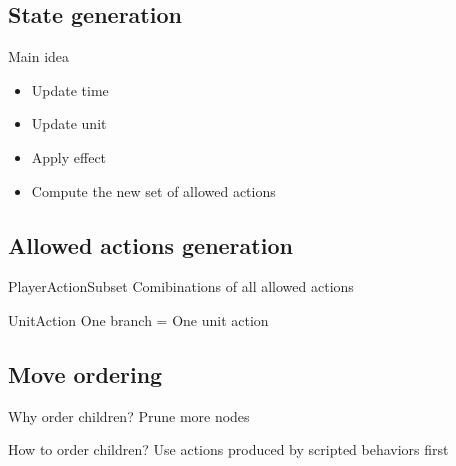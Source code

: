 \documentclass{beamer}
\newenvironment{framesubsec}{
    \begin{frame}{\subsecname}
}{\end{frame}}
\begin{document}
\subsection{State generation}
\begin{framesubsec}
    \begin{block}{Main idea}
        \begin{itemize}
            \item Update time
            \item Update unit
            \item Apply effect 
            \item Compute the new set of allowed actions 
        \end{itemize}
    \end{block}
\end{framesubsec}

\subsection{Allowed actions generation}
\begin{framesubsec}
    \begin{block}{PlayerActionSubset}
        Comibinations of all allowed actions
    \end{block}
    \begin{block}{UnitAction}
        One branch = One unit action
    \end{block}
\end{framesubsec}

\subsection{Move ordering}
\begin{framesubsec}
    \begin{block}{Why order children?}
        Prune more nodes
    \end{block}
    \begin{block}{How to order children?}
        Use actions produced by scripted behaviors first
    \end{block}
\end{framesubsec}
\end{document}

